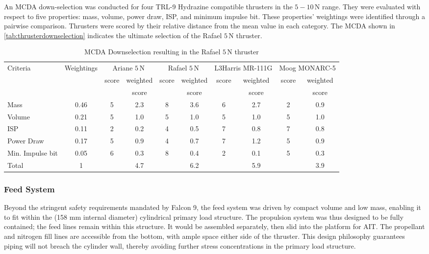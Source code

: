 \documentclass[a4paper, 11pt, conference]{IEEEtran}
\begin{document}
An MCDA down-selection was conducted for four TRL-9 Hydrazine compatible thrusters in the $5-10\,\mathrm{N}$ range. They were evaluated with respect to five properties: mass, volume, power draw, ISP, and minimum impulse bit. These properties' weightings were identified through a pairwise comparison. Thrusters were scored by their relative distance from the mean value in each category. The MCDA shown in \autoref{tab:thrusterdownselection} indicates the ultimate selection of the Rafael $5\,\mathrm{N}$ thruster.

\begin{table}[H]
\centering
\caption{MCDA Downselection resulting in the Rafael $5\,\mathrm{N}$ thruster}
\label{tab:thrusterdownselection}
\begin{tabular}{l *{9}{c}}
\toprule
\multirow{2}{*}{Criteria} & 
\multirow{2}{*}{Weightings} & 
\multicolumn{2}{c}{Ariane $5\,\mathrm{N}$} & 
\multicolumn{2}{c}{\cellcolor{yellow!25}Rafael $5\,\mathrm{N}$} & 
\multicolumn{2}{c}{L3Harris MR-111G} & 
\multicolumn{2}{c}{Moog MONARC-5} \\
\cmidrule(lr){3-4} \cmidrule(lr){5-6} \cmidrule(lr){7-8} \cmidrule(lr){9-10}
 & & score & weighted & score & \cellcolor{yellow!25}weighted & score & weighted & score & weighted \\
 & & & score & & \cellcolor{yellow!25}score & & score & & score \\
\midrule
Mass & 0.46 & 5 & 2.3 & 8 & \cellcolor{yellow!25}3.6 & 6 & 2.7 & 2 & 0.9 \\
Volume & 0.21 & 5 & 1.0 & 5 & \cellcolor{yellow!25}1.0 & 5 & 1.0 & 5 & 1.0 \\
ISP & 0.11 & 2 & 0.2 & 4 & \cellcolor{yellow!25}0.5 & 7 & 0.8 & 7 & 0.8 \\
Power Draw & 0.17 & 5 & 0.9 & 4 & \cellcolor{yellow!25}0.7 & 7 & 1.2 & 5 & 0.9 \\
Min. Impulse bit & 0.05 & 6 & 0.3 & 8 & \cellcolor{yellow!25}0.4 & 2 & 0.1 & 5 & 0.3 \\
\midrule
Total & 1 & & 4.7 & & \cellcolor{yellow!25}6.2 & & 5.9 & & 3.9 \\
\bottomrule
\end{tabular}
\end{table}

\subsubsection{Feed System}
Beyond the stringent safety requirements mandated by Falcon 9, the feed system was driven by compact volume and low mass, enabling it to fit within the (158 mm internal diameter) cylindrical primary load structure. The propulsion system was thus designed to be fully contained; the feed lines remain within this structure. It would be assembled separately, then slid into the platform for AIT. The propellant and nitrogen fill lines are accessible from the bottom, with ample space either side of the thruster. This design philosophy guarantees piping will not breach the cylinder wall, thereby avoiding further stress concentrations in the primary load structure.
\end{document}
